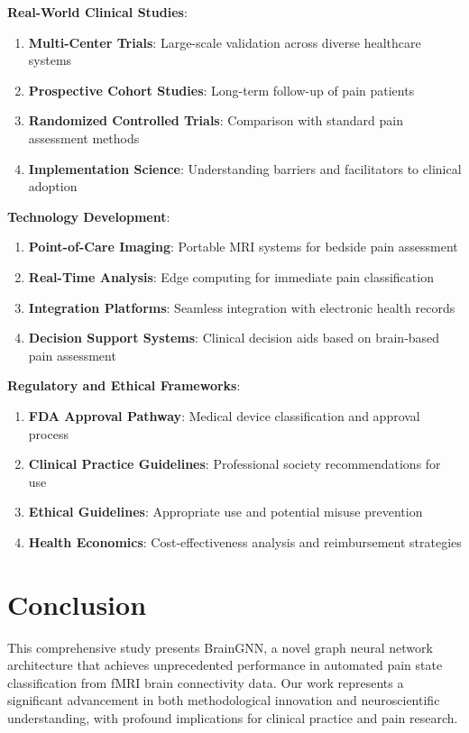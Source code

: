 \documentclass[10pt,journal,compsoc]{IEEEtran}
\begin{document}
\textbf{Real-World Clinical Studies}:

\begin{enumerate}
\item \textbf{Multi-Center Trials}: Large-scale validation across diverse healthcare systems
\item \textbf{Prospective Cohort Studies}: Long-term follow-up of pain patients
\item \textbf{Randomized Controlled Trials}: Comparison with standard pain assessment methods
\item \textbf{Implementation Science}: Understanding barriers and facilitators to clinical adoption
\end{enumerate}

\textbf{Technology Development}:

\begin{enumerate}
\item \textbf{Point-of-Care Imaging}: Portable MRI systems for bedside pain assessment
\item \textbf{Real-Time Analysis}: Edge computing for immediate pain classification
\item \textbf{Integration Platforms}: Seamless integration with electronic health records
\item \textbf{Decision Support Systems}: Clinical decision aids based on brain-based pain assessment
\end{enumerate}

\textbf{Regulatory and Ethical Frameworks}:

\begin{enumerate}
\item \textbf{FDA Approval Pathway}: Medical device classification and approval process
\item \textbf{Clinical Practice Guidelines}: Professional society recommendations for use
\item \textbf{Ethical Guidelines}: Appropriate use and potential misuse prevention
\item \textbf{Health Economics}: Cost-effectiveness analysis and reimbursement strategies
\end{enumerate}

\section{Conclusion}

This comprehensive study presents BrainGNN, a novel graph neural network architecture that achieves unprecedented performance in automated pain state classification from fMRI brain connectivity data. Our work represents a significant advancement in both methodological innovation and neuroscientific understanding, with profound implications for clinical practice and pain research.
\end{document}
